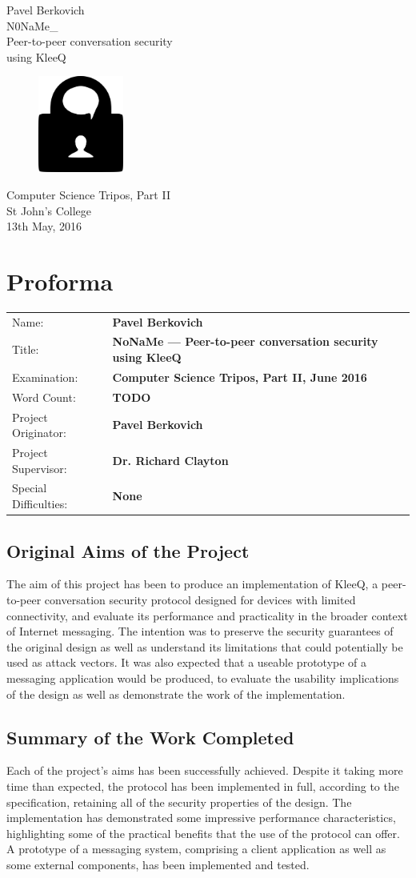 \documentclass[a4paper, 12pt]{report}
\newcommand{\funkytt}{\fontfamily{AnonymousPro}\selectfont}
\newcommand*{\titleTH}{ %
\begingroup
\raggedleft
\thispagestyle{empty}
{\Large Pavel Berkovich}\\[0.167\textheight] \centering
{\huge{\funkytt N0NaMe\_}}\\[\baselineskip]
{\Large Peer-to-peer conversation security \\ using KleeQ} \\
\vspace{2.5cm}
\begin{figure}[h]
    \centering
    \includegraphics[width = 0.25\textwidth]{lock_chat.png.png} 
\end{figure}
\vspace{3cm}
{\large Computer Science Tripos, Part II}\\ \vspace{3mm}
{\large St John's College} \\ \vspace{3mm}
{\large 13th May, 2016}
\vfill
\clearpage
\endgroup}
\begin{document}
\titleTH


\chapter*{Proforma}
\begin{tabular}{l >{\bfseries}l}
    Name: & Pavel Berkovich \\
    Title: & NoNaMe --- Peer-to-peer conversation security using KleeQ \\
    Examination: & Computer Science Tripos, Part II, June 2016 \\
    Word Count: & {\color{red} TODO} \\
    Project Originator: & Pavel Berkovich \\
    Project Supervisor: & Dr. Richard Clayton \\
    Special Difficulties: & None
\end{tabular}

\section*{Original Aims of the Project}
The aim of this project has been to produce an implementation of KleeQ, a peer-to-peer conversation security protocol designed for devices with limited connectivity, and evaluate its performance and practicality in the broader context of Internet messaging. The intention was to preserve the security guarantees of the original design as well as understand its limitations that could potentially be used as attack vectors. It was also expected that a useable prototype of a messaging application would be produced, to evaluate the usability implications of the design as well as demonstrate the work of the implementation.

\section*{Summary of the Work Completed}

Each of the project's aims has been successfully achieved. Despite it taking more time than expected, the protocol has been implemented in full, according to the specification, retaining all of the security properties of the design. The implementation has demonstrated some impressive performance characteristics, highlighting some of the practical benefits that the use of the protocol can offer. A prototype of a messaging system, comprising a client application as well as some external components, has been implemented and tested. \\
\end{document}
